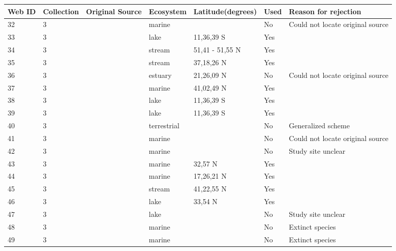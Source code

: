 \documentclass[12pt]{article}
\begin{document}
\begin{landscape}
    \begin{table}[h!]
    \centering
    {\footnotesize
      \begin{tabular}{p{2.8cm}p{1.3cm}p{5.5cm}p{2.2cm}p{2.5cm}lp{3.5cm}}
        \hline
        Web ID & Collection & Original Source & Ecosystem & Latitude(degrees) & Used  & Reason for rejection  \\
        \hline
        32    & 3 & \citet{Petipa1970}  & marine &       & No    & Could not locate original source \\
        33    & 3 & \citet{Fryer1959} & lake & 11,36,39 S & Yes   &       \\
        34    & 3 & \citet{Jones1949}     & stream & 51,41 - 51,55 N & Yes   &       \\
        35    & 3 & \citet{Minshall1967}    & stream & 37,18,26 N & Yes   &       \\
        36    & 3 & \citet{Walsh1967}  & estuary & 21,26,09 N & No    & Could not locate original source \\
        37    & 3 & \citet{Clarke1967}    & marine & 41,02,49 N & Yes   &       \\
        38    & 3 & \citet{Fryer1959} & lake & 11,36,39 S & Yes   &       \\
        39    & 3 & \citet{Fryer1959} & lake & 11,36,39 S & Yes   &       \\
        40    & 3 & \citet{Harrison1962}  & terrestrial &       & No    & Generalized scheme \\
        41    & 3 & \citet{Parin1970}  & marine &       & No    & Could not locate original source \\
        42    & 3 & \citet{Vinogradov1978}  & marine &       & No    & Study site unclear \\
        43    & 3 & \citet{Rosenthal1974}    & marine & 32,57 N & Yes   &       \\
        44    & 3 & \citet{Yanez1978}  & marine & 17,26,21 N & Yes   &       \\
        45    & 3 & \citet{Tilly1968}    & stream & 41,22,55 N & Yes   &       \\
        46    & 3 & \citet{Patten1975}    & lake & 33,54 N & Yes   &       \\
        47    & 3 & \citet{Harris1980}    & lake &       & No    & Study site unclear \\
        48    & 3 & \citet{Simenstad1978}    & marine &       & No    & Extinct species \\
        49    & 3 & \citet{Simenstad1978}    & marine &       & No    & Extinct species \\

\end{tabular}}
\end{table}
\end{landscape}
\end{document}
